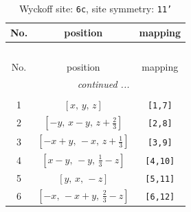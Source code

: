 \documentclass[fleqn,8pt]{jsarticle}
\begin{document}
\renewcommand{\arraystretch}{1.2}
\begin{longtable}{ccc}
\caption{Wyckoff site: {\tt 6c}, site symmetry: {\tt 11'}}
 \\
 \hline \hline
No. & position & mapping \\ \hline \endfirsthead

\multicolumn{2}{l}{\tablename\ \thetable{}} \\
 \hline \hline
No. & position & mapping \\ \hline \endhead

 \hline \hline
\multicolumn{2}{r}{\footnotesize\it continued ...} \\ \endfoot

 \hline \hline
\multicolumn{2}{r}{} \\ \endlastfoot

1 & $\left[ x,\, y,\, z \right]$ & {\tt [1,7]} \\ \hline
2 & $\left[ - y,\, x - y,\, z + \frac{2}{3} \right]$ & {\tt [2,8]} \\ \hline
3 & $\left[ - x + y,\, - x,\, z + \frac{1}{3} \right]$ & {\tt [3,9]} \\ \hline
4 & $\left[ x - y,\, - y,\, \frac{1}{3} - z \right]$ & {\tt [4,10]} \\ \hline
5 & $\left[ y,\, x,\, - z \right]$ & {\tt [5,11]} \\ \hline
6 & $\left[ - x,\, - x + y,\, \frac{2}{3} - z \right]$ & {\tt [6,12]} \\
\end{longtable}
\end{document}

